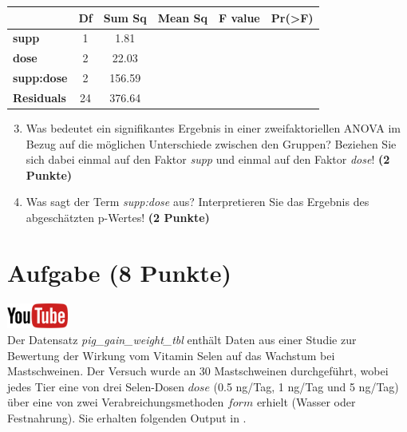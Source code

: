 \documentclass[a4paper, 10pt]{scrartcl}\usepackage[]{graphicx}\usepackage[]{xcolor}
\begin{document}
\vspace{1Ex}

\begin{center}
  \Large
  \begin{tabular}{l|c|c|c|c|c}
     & \textbf{Df} & \textbf{Sum Sq} & \textbf{Mean Sq} & \textbf{F value} & \textbf{Pr(>F)} \strut\\
    \hline
   \textbf{supp}  & 1 & 1.81 &  &  &  \strut\\
    \hline
    \textbf{dose}  & 2 & 22.03 &  &  &  \strut\\
    \hline
    \textbf{supp:dose}  & 2 & 156.59 &  &  &  \strut\\
    \hline
   \textbf{Residuals}  & 24 & 376.64 &  &  &  \strut\\
  \end{tabular}
\end{center}

\vspace{1Ex}

\begin{enumerate}
  \setcounter{enumi}{2}
\item Was bedeutet ein signifikantes Ergebnis in einer zweifaktoriellen
  ANOVA im Bezug auf die m{\"o}glichen Unterschiede zwischen den Gruppen?
  Beziehen Sie sich dabei einmal auf den Faktor \textit{supp} und einmal
  auf den Faktor \textit{dose}! \textbf{(2 Punkte)}
\item Was sagt der Term \textit{supp:dose} aus? Interpretieren Sie das
  Ergebnis des abgesch{\"a}tzten p-Wertes! \textbf{(2 Punkte)}
\end{enumerate}
 
\clearpage

\section{Aufgabe \hfill (8 Punkte)}

\hfill\href{https://youtu.be/rWTyHXXlYjY}{\includegraphics[width =
  2cm]{img/youtube}}\\[1Ex]


Der Datensatz \textit{pig\_gain\_weight\_tbl} enth{\"a}lt Daten aus einer Studie zur Bewertung
der Wirkung vom Vitamin Selen auf das Wachstum bei Mastschweinen. Der
Versuch wurde an 30 Mastschweinen durchgef{\"u}hrt, wobei
jedes Tier eine von drei Selen-Dosen $dose$ (0.5 ng/Tag, 1 ng/Tag und 5 ng/Tag)
{\"u}ber eine von zwei Verabreichungsmethoden $form$ erhielt (Wasser oder
Festnahrung). Sie erhalten folgenden Output in \Rlogo.
\end{document}
